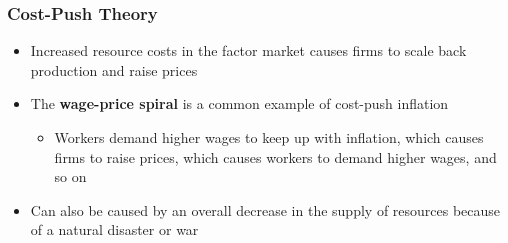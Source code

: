 \documentclass[
  letterpaper,
  DIV=11,
  numbers=noendperiod]{scrartcl}
\providecommand{\tightlist}{%
  \setlength{\itemsep}{0pt}\setlength{\parskip}{0pt}}\usepackage{longtable,booktabs,array}
\begin{document}
\subsubsection{Cost-Push Theory}\label{cost-push-theory}

\begin{itemize}
\tightlist
\item
  Increased resource costs in the factor market causes firms to scale
  back production and raise prices
\item
  The \textbf{wage-price spiral} is a common example of cost-push
  inflation

  \begin{itemize}
  \tightlist
  \item
    Workers demand higher wages to keep up with inflation, which causes
    firms to raise prices, which causes workers to demand higher wages,
    and so on
  \end{itemize}
\item
  Can also be caused by an overall decrease in the supply of resources
  because of a natural disaster or war
\end{itemize}
\end{document}
